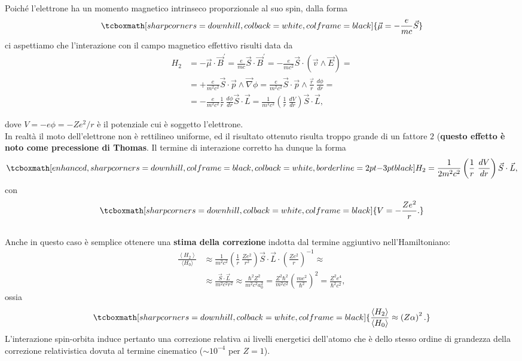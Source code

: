 Poiché l'elettrone ha un momento magnetico intrinseco proporzionale al suo spin, dalla forma
	\begin{equation} 
		\tcboxmath[sharp corners=downhill, colback=white, colframe=black]{
			\vec{\mu}=-\frac{e}{mc}\vec{S}
			}
	\end{equation}
ci aspettiamo che l'interazione con il campo magnetico effettivo risulti data da
	\begin{align}
		H_2 & =  -\vec{\mu} \cdot \vec{B}^{'}=\frac{e}{mc} \vec{S} \cdot \vec{B}^{'}= -\frac{e}{mc^2}\vec{S} \cdot \left( \vec{v} \wedge \vec{E} \right)= \nonumber \\
		& =  + \frac{e}{m^2c^2}\vec{S} \cdot \vec{p} \wedge \vec{\nabla}\phi= \frac{e}{m^2c^2}\vec{S} \cdot \vec{p} \wedge \frac{\vec{r}}{r} \ \frac{d\phi}{dr}= \nonumber \\
		& =  -\frac{e}{m^2c^2}\frac{1}{r} \ \frac{d\phi}{dr}\vec{S} \cdot \vec{L}= \frac{1}{m^2c^2} \left( \frac{1}{r} \ \frac{dV}{dr} \right) \vec{S} \cdot \vec{L} ,
	\end{align}

dove $V=-e\phi=- Z e^2/r$ è il potenziale cui è soggetto l'elettrone. \\

In realtà il moto dell'elettrone non è rettilineo uniforme, ed il risultato ottenuto risulta troppo grande di un fattore $2$ (\textbf{questo effetto è noto come precessione di Thomas}. Il termine di interazione corretto ha dunque la forma
	\begin{equation}
	\label{eq:cap25_3}
		\tcboxmath[enhanced, sharp corners=downhill, colframe=black, colback=white, borderline={2pt}{-3pt}{black}]{
			H_2=\frac{1}{2m^2c^2} \left( \frac{1}{r} \ \frac{dV}{dr} \right) \vec{S} \cdot \vec{L} ,
			}
	\end{equation}
con
	\begin{equation} 
		\tcboxmath[sharp corners=downhill, colback=white, colframe=black]{
		V=-\frac{ Z e^2}{r} .
		}
	\end{equation}\\
	
Anche in questo caso è semplice ottenere una \textbf{stima della correzione} indotta dal termine aggiuntivo nell'Hamiltoniano:
	\begin{align}
		\frac{\left< H_2 \right>}{\langle H_0 \rangle} & \approx   \frac{1}{m^2c^2} \left( \frac{1}{r} \ \frac{ Ze^2}{r^2} \right) \vec{S} \cdot \vec{L} \cdot \left( \frac{Ze^2}{r} \right)^{-1} \approx \nonumber  \\
		& \approx  \frac{\vec{S} \cdot \vec{L}}{m^2c^2r^2} \approx  \frac{\hbar^2 Z^2}{m^2c^2a_0^2}=  \frac{Z^2 \hbar^2}{m^2c^2}\left( \frac{me^2}{\hbar^2} \right)^2= \frac{Z^2e^4}{\hbar^2c^2} ,
	\end{align}
ossia
	\begin{equation} 
		\tcboxmath[sharp corners=downhill, colback=white, colframe=black]{
		\frac{\left< H_2 \right>}{\langle H_0 \rangle} \approx \left( Z\alpha \right)^2 .
		}
	\end{equation}
L'interazione spin-orbita induce pertanto una correzione relativa ai livelli energetici dell'atomo che è dello stesso ordine di grandezza della correzione relativistica dovuta al termine cinematico ($\sim10^{-4}$ per $ Z =1$).
